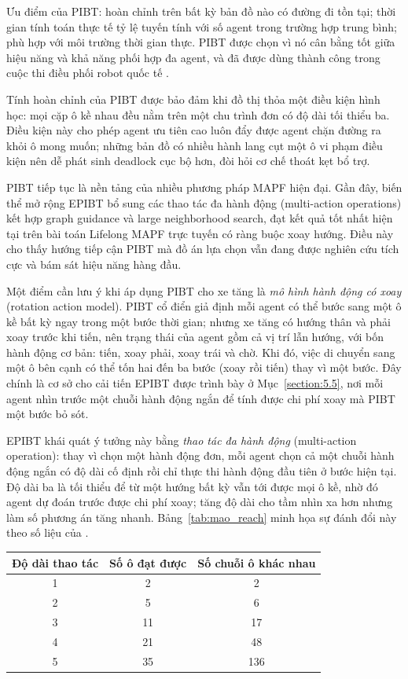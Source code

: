 \documentclass[../DoAn.tex]{subfiles}
\begin{document}
Ưu điểm của PIBT: hoàn chỉnh trên bất kỳ bản đồ nào có đường đi tồn tại; thời gian
tính toán thực tế tỷ lệ tuyến tính với số agent trong trường hợp trung bình; phù hợp
với môi trường thời gian thực. PIBT được chọn vì nó cân bằng tốt giữa hiệu năng và
khả năng phối hợp đa agent, và đã được dùng thành công trong cuộc thi điều phối robot
quốc tế \cite{lorr2024}.

Tính hoàn chỉnh của PIBT được bảo đảm khi đồ thị thỏa một điều kiện hình học: mọi cặp ô kề
nhau đều nằm trên một chu trình đơn có độ dài tối thiểu ba. Điều kiện này cho phép agent ưu
tiên cao luôn đẩy được agent chặn đường ra khỏi ô mong muốn; những bản đồ có nhiều hành lang
cụt một ô vi phạm điều kiện nên dễ phát sinh deadlock cục bộ hơn, đòi hỏi cơ chế thoát kẹt bổ trợ.

PIBT tiếp tục là nền tảng của nhiều phương pháp MAPF hiện đại. Gần đây, biến thể mở rộng
EPIBT \cite{yukhnevich2025epibt} bổ sung các thao tác đa hành động (multi-action
operations) kết hợp graph guidance và large neighborhood search, đạt kết quả tốt nhất
hiện tại trên bài toán Lifelong MAPF trực tuyến có ràng buộc xoay hướng. Điều này cho
thấy hướng tiếp cận PIBT mà đồ án lựa chọn vẫn đang được nghiên cứu tích cực và bám sát
hiệu năng hàng đầu.

Một điểm cần lưu ý khi áp dụng PIBT cho xe tăng là \emph{mô hình hành động có xoay}
(rotation action model). PIBT cổ điển giả định mỗi agent có thể bước sang một ô kề bất kỳ
ngay trong một bước thời gian; nhưng xe tăng có hướng thân và phải xoay trước khi tiến, nên
trạng thái của agent gồm cả vị trí lẫn hướng, với bốn hành động cơ bản: tiến, xoay phải, xoay
trái và chờ. Khi đó, việc di chuyển sang một ô bên cạnh có thể tốn hai đến ba bước (xoay rồi
tiến) thay vì một bước. Đây chính là cơ sở cho cải tiến EPIBT được trình bày ở
Mục~\ref{section:5.5}, nơi mỗi agent nhìn trước một chuỗi hành động ngắn để tính được chi phí
xoay mà PIBT một bước bỏ sót.

EPIBT khái quát ý tưởng này bằng \emph{thao tác đa hành động} (multi-action operation): thay vì
chọn một hành động đơn, mỗi agent chọn cả một chuỗi hành động ngắn có độ dài cố định rồi chỉ
thực thi hành động đầu tiên ở bước hiện tại. Độ dài ba là tối thiểu để từ một hướng bất kỳ vẫn
tới được mọi ô kề, nhờ đó agent dự đoán trước được chi phí xoay; tăng độ dài cho tầm nhìn xa hơn
nhưng làm số phương án tăng nhanh. Bảng~\ref{tab:mao_reach} minh họa sự đánh đổi này theo số liệu
của \cite{yukhnevich2025epibt}.

\begin{center}
\label{tab:mao_reach}
\small
\begin{tabular}{ccc}
\hline
\textbf{Độ dài thao tác} & \textbf{Số ô đạt được} & \textbf{Số chuỗi ô khác nhau} \\ \hline
1 & 2  & 2   \\
2 & 5  & 6   \\
3 & 11 & 17  \\
4 & 21 & 48  \\
5 & 35 & 136 \\ \hline
\end{tabular}
\end{center}
\end{document}
